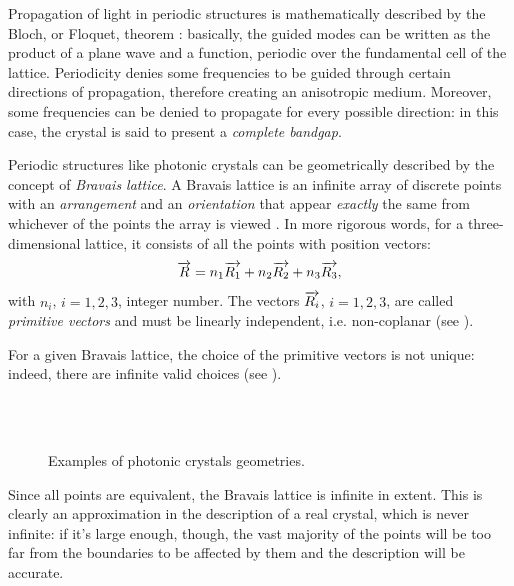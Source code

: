 Propagation of light in periodic structures is mathematically
described by the Bloch, or Floquet, theorem \cite{floquet_sur}:
basically, the guided modes can be written as the product of a plane
wave and a function, periodic over the fundamental cell of the
lattice. Periodicity denies some frequencies to be guided through
certain directions of propagation, therefore creating an anisotropic
medium. Moreover, some frequencies can be denied to propagate for
every possible direction: in this case, the crystal is said to present
a \emph{complete bandgap}.

Periodic structures like photonic crystals can be geometrically
described by the concept of \emph{Bravais lattice}. A Bravais lattice
is an infinite array of discrete points with an \emph{arrangement} and
an \emph{orientation} that appear \emph{exactly} the same from
whichever of the points the array is viewed \cite{kittel_solid}. In
more rigorous words, for a three-dimensional
lattice, it consists of all the points with position vectors:
\begin{equation*}
  \overrightarrow{R} = n_1 \overrightarrow{R_1} + n_2 \overrightarrow{R_2} + n_3 \overrightarrow{R_3},
\end{equation*}
with $n_i$, $i = 1,2,3$, integer number. The vectors $\overrightarrow{R_i}$,
$i = 1,2,3$, are called \emph{primitive vectors} and must be linearly
independent, i.e. non-coplanar (see ).

For a given Bravais lattice, the choice of the primitive vectors is
not unique: indeed, there are infinite valid choices (see
).

\begin{figure}[htbp]
  \begin{center}
     \\
     \\
  \end{center}
  \caption{Examples of photonic crystals geometries.}
  \label{fig:lattices}
\end{figure}

Since all points are equivalent, the Bravais lattice is infinite in
extent. This is clearly an approximation in the description of a real
crystal, which is never infinite: if it's large enough, though, the
vast majority of the points will be too far from the boundaries to be
affected by them and the description will be accurate.


